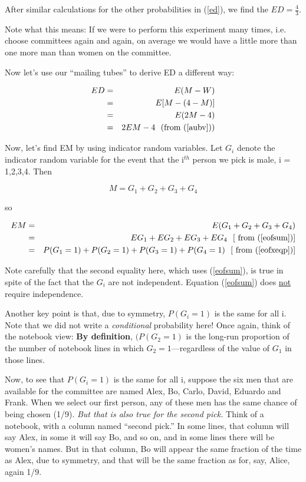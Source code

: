 After similar calculations for the other probabilities in (\ref{ed}),
we find the $ED = \frac{4}{3}$.  

Note what this means: If we were to perform this experiment many times,
i.e. choose committees again and again, on average we would have a
little more than one more man than women on the committee.

Now let's use our ``mailing tubes'' to derive ED a different way:

\begin{eqnarray}
ED &=& E(M - W) \\ 
&=& E[ M - (4-M)] \\
&=& E(2 M - 4) \\
&=& 2 EM - 4 ~~ (\textrm{from } (\ref{aubv})) 
\end{eqnarray}

Now, let's find EM by using indicator random variables.  Let $G_i$
denote the indicator random variable for the event that the i$^{th}$
person we pick is male, i = 1,2,3,4.  Then

\begin{equation}
\label{massum}
M = G_1 + G_2 + G_3 + G_4
\end{equation}

so 

\begin{eqnarray}
EM &=& E(G_1 + G_2 + G_3 + G_4) \\ 
&=& EG_1 + EG_2 + EG_3 + EG_4 ~~  [\textrm{ from } (\ref{eofsum})] \\
&=& P(G_1 = 1) + P(G_2 = 1) + P(G_3 = 1) + P(G_4 = 1) ~~ [\textrm{ from } (\ref{eofxeqp})]
\label{4g}
\end{eqnarray}

Note carefully that the second equality here, which uses (\ref{eofsum}),
is true in spite of the fact that the $G_i$ are not independent.
Equation (\ref{eofsum}) does \underline{not} require independence.

Another key point is that, due to symmetry, $P(G_i = 1)$ is the same for
all i.  Note that we did not write a {\it conditional} probability
here!  Once again, think of the notebook view:  {\large \bf By
definition}, $(P(G_2 = 1)$ is the long-run proportion of the number of
notebook lines in which $G_2 = 1$---regardless of the value of $G_1$ in
those lines.

Now, to see that $P(G_i = 1)$ is the same for all i, suppose the six men
that are available for the committee are named Alex, Bo, Carlo, David,
Eduardo and Frank.  When we select our first person, any of these men
has the same chance of being chosen (1/9).  {\it But that is also true
for the second pick.}  Think of a notebook, with a column named ``second
pick.''  In some lines, that column will say Alex, in some it will say
Bo, and so on, and in some lines there will be women's names.  But in
that column, Bo will appear the same fraction of the time as Alex, due
to symmetry, and that will be the same fraction as for, say, Alice,
again 1/9.

